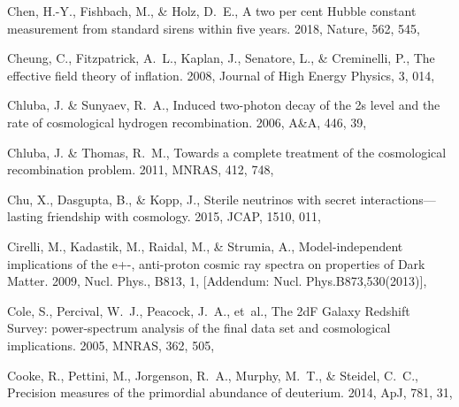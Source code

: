 \documentclass[longauth,traditabstract]{aa}
\def\aap{{A\&A}}
\def\apj{{ApJ}}
\def\mnras{{MNRAS}}
\begin{document}
\begin{thebibliography}{379}
Chen, H.-Y., Fishbach, M., \& Holz, D.~E., {A two per cent Hubble constant
  measurement from standard sirens within five years}. 2018, Nature, 562, 545,

{Cheung}, C., {Fitzpatrick}, A.~L., {Kaplan}, J., {Senatore}, L., \&
  {Creminelli}, P., {The effective field theory of inflation}. 2008, Journal of
  High Energy Physics, 3, 014, 

{Chluba}, J. \& {Sunyaev}, R.~A., {Induced two-photon decay of the 2s level and
  the rate of cosmological hydrogen recombination}. 2006, \aap, 446, 39,

{Chluba}, J. \& {Thomas}, R.~M., {Towards a complete treatment of the
  cosmological recombination problem}. 2011, \mnras, 412, 748,

Chu, X., Dasgupta, B., \& Kopp, J., {Sterile neutrinos with secret
  interactions—lasting friendship with cosmology}. 2015, JCAP, 1510, 011,

Cirelli, M., Kadastik, M., Raidal, M., \& Strumia, A., {Model-independent
  implications of the e+-, anti-proton cosmic ray spectra on properties of Dark
  Matter}. 2009, Nucl. Phys., B813, 1, [Addendum: Nucl. Phys.B873,530(2013)],

{Cole}, S., {Percival}, W.~J., {Peacock}, J.~A., {et~al.}, {The 2dF Galaxy
  Redshift Survey: power-spectrum analysis of the final data set and
  cosmological implications}. 2005, \mnras, 362, 505,

Cooke, R., Pettini, M., Jorgenson, R.~A., Murphy, M.~T., \& Steidel, C.~C.,
  {Precision measures of the primordial abundance of deuterium}. 2014, \apj,
  781, 31, 


\end{thebibliography}
\end{document}
